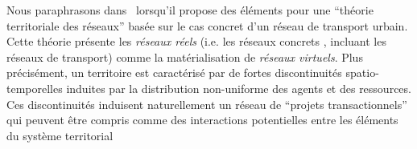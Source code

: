 {}{
Nous paraphrasons  dans~\cite{dupuy1987vers} lorsqu'il propose des éléments pour une ``théorie territoriale des réseaux'' basée sur le cas concret d'un réseau de transport urbain. Cette théorie présente les \emph{réseaux réels} (i.e. les réseaux concrets %
, incluant les réseaux de transport) comme la matérialisation de \emph{réseaux virtuels}. Plus précisément, un territoire est caractérisé par de fortes discontinuités spatio-temporelles induites par la distribution non-uniforme des agents et des ressources. Ces discontinuités induisent naturellement un réseau de ``projets transactionnels'' qui peuvent être compris comme des interactions potentielles entre les éléments du système territorial %
}
